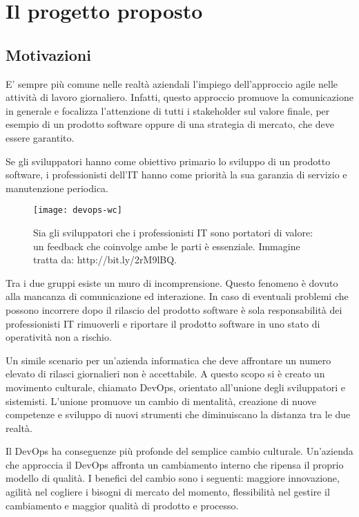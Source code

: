 \section{Il progetto proposto}
\subsection{Motivazioni}

E' sempre più comune nelle realtà aziendali l'impiego dell'approccio agile nelle attività di lavoro giornaliero. Infatti, questo approccio promuove la comunicazione in generale e focalizza l'attenzione di tutti i stakeholder sul valore finale, per esempio di un prodotto software oppure di una strategia di mercato, che deve essere garantito. 

Se gli sviluppatori hanno come obiettivo primario lo sviluppo di un prodotto software, i professionisti dell'IT hanno come priorità la sua garanzia di servizio e manutenzione periodica. 

\begin{figure}[htbp]
	\begin{center}
		\texttt{[image: devops-wc]}
		\caption{Sia gli sviluppatori che i professionisti IT sono portatori di valore: un feedback che coinvolge ambe le parti è essenziale. Immagine tratta da: http://bit.ly/2rM9lBQ.}
	\end{center}
\end{figure}


Tra i due gruppi esiste un muro di incomprensione. Questo fenomeno è dovuto alla mancanza di comunicazione ed interazione. In caso di eventuali problemi che possono incorrere dopo il rilascio del prodotto software è sola responsabilità dei professionisti IT rimuoverli e riportare il prodotto software in uno stato di operatività non a rischio.

Un simile scenario per un'azienda informatica che deve affrontare un numero elevato di rilasci giornalieri non è accettabile. A questo scopo si è creato un movimento culturale, chiamato DevOps, orientato all'unione degli sviluppatori e sistemisti. L'unione promuove un cambio di mentalità, creazione di nuove competenze e sviluppo di nuovi strumenti che diminuiscano la distanza tra le due realtà. 

Il DevOps ha conseguenze più profonde del semplice cambio culturale. Un'azienda che 
approccia il DevOps affronta un cambiamento interno che ripensa il proprio modello di qualità. I benefici del cambio sono i seguenti: maggiore innovazione, agilità nel cogliere i bisogni di mercato del momento, flessibilità nel gestire il cambiamento e maggior qualità di prodotto e processo.

